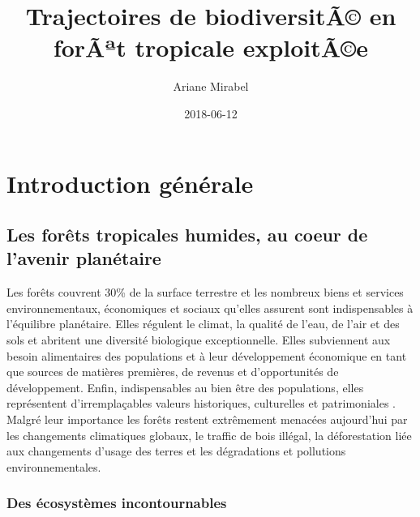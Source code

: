 \documentclass[
  11pt,
  french,
  A4paper,
  extrafontsizes,onecolumn,openright
  ]{memoir}
\title{Trajectoires de biodiversitÃ© en forÃªt tropicale exploitÃ©e}
\author{Ariane Mirabel}
\date{2018-06-12}
\begin{document}
\frontmatter



\makeflyleaf









\LargeMargins
{
\hypersetup{linkcolor=}
\setcounter{tocdepth}{3}
\tableofcontents
}



\LargeMargins
\mainmatter

\chapter{Introduction générale}\label{introduction-generale}

\section{Les forêts tropicales humides, au coeur de l'avenir
planétaire}\label{les-forets-tropicales-humides-au-coeur-de-lavenir-planetaire}

Les forêts couvrent 30\% de la surface terrestre et les nombreux biens
et services environnementaux, économiques et sociaux qu'elles assurent
sont indispensables à l'équilibre planétaire. Elles régulent le climat,
la qualité de l'eau, de l'air et des sols et abritent une diversité
biologique exceptionnelle. Elles subviennent aux besoin alimentaires des
populations et à leur développement économique en tant que sources de
matières premières, de revenus et d'opportunités de développement.
Enfin, indispensables au bien être des populations, elles représentent
d'irremplaçables valeurs historiques, culturelles et patrimoniales
\autocites{FRA2015}{Tilman2014}. Malgré leur importance les forêts
restent extrêmement menacées aujourd'hui par les changements climatiques
globaux, le traffic de bois illégal, la déforestation liée aux
changements d'usage des terres et les dégradations et pollutions
environnementales.

\subsection{Des écosystèmes
incontournables}\label{des-ecosystemes-incontournables}
\end{document}
